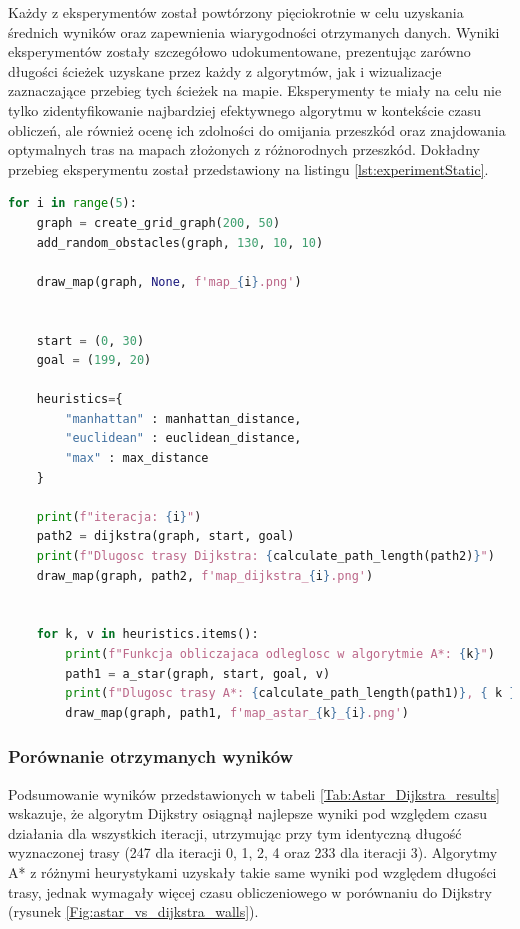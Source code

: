 \documentclass[12pt,twoside]{article}
\begin{document}
Każdy z eksperymentów został powtórzony pięciokrotnie w celu uzyskania średnich wyników oraz zapewnienia wiarygodności otrzymanych danych. Wyniki eksperymentów zostały szczegółowo udokumentowane, prezentując zarówno długości ścieżek uzyskane przez każdy z algorytmów, jak i wizualizacje zaznaczające przebieg tych ścieżek na mapie. Eksperymenty te miały na celu nie tylko zidentyfikowanie najbardziej efektywnego algorytmu w kontekście czasu obliczeń, ale również ocenę ich zdolności do omijania przeszkód oraz znajdowania optymalnych tras na mapach złożonych z różnorodnych przeszkód. Dokładny przebieg eksperymentu został przedstawiony na listingu \ref{lst:experimentStatic}.


\begin{lstlisting}[language=Python, caption={Porównanie algorytmów}, label={lst:experimentStatic}]
for i in range(5):
    graph = create_grid_graph(200, 50)
    add_random_obstacles(graph, 130, 10, 10)

    draw_map(graph, None, f'map_{i}.png')


    start = (0, 30)
    goal = (199, 20)

    heuristics={
        "manhattan" : manhattan_distance,
        "euclidean" : euclidean_distance,
        "max" : max_distance
    }

    print(f"iteracja: {i}")
    path2 = dijkstra(graph, start, goal)
    print(f"Dlugosc trasy Dijkstra: {calculate_path_length(path2)}")
    draw_map(graph, path2, f'map_dijkstra_{i}.png')


    for k, v in heuristics.items():
        print(f"Funkcja obliczajaca odleglosc w algorytmie A*: {k}")
        path1 = a_star(graph, start, goal, v)
        print(f"Dlugosc trasy A*: {calculate_path_length(path1)}, { k }")
        draw_map(graph, path1, f'map_astar_{k}_{i}.png')
\end{lstlisting}

\newpage

\subsubsection{Porównanie otrzymanych wyników}

Podsumowanie wyników przedstawionych w tabeli \ref{Tab:Astar_Dijkstra_results} wskazuje, że algorytm Dijkstry osiągnął najlepsze wyniki pod względem czasu działania dla wszystkich iteracji, utrzymując przy tym identyczną długość wyznaczonej trasy (247 dla iteracji 0, 1, 2, 4 oraz 233 dla iteracji 3). Algorytmy A* z różnymi heurystykami uzyskały takie same wyniki pod względem długości trasy, jednak wymagały więcej czasu obliczeniowego w porównaniu do Dijkstry (rysunek \ref{Fig:astar_vs_dijkstra_walls}).
\end{document}
